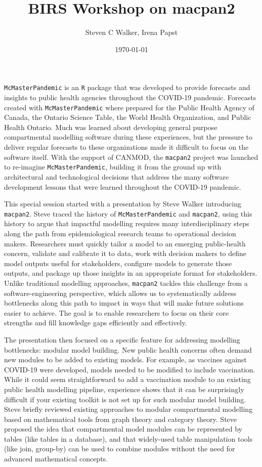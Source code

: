 \documentclass{article}
\title{BIRS Workshop on macpan2}
\date{\today}
\author{Steven C Walker, Irena Papst}
\newcommand{\macpan}{\texttt{macpan2}\xspace}
\newcommand{\macpanOrig}{\texttt{McMasterPandemic}\xspace}
\newcommand{\R}{\texttt{R}\xspace}
\begin{document}
  \maketitle

  \macpanOrig is an \R package that was developed to provide forecasts and insights to public health agencies throughout the COVID-19 pandemic. Forecasts created with \macpanOrig where prepared for the Public Health Agency of Canada, the Ontario Science Table, the World Health Organization, and Public Health Ontario. Much was learned about developing general purpose compartmental modelling software during these experiences, but the pressure to deliver regular forecasts to these organizations made it difficult to focus on the software itself. With the support of CANMOD, the \macpan project was launched to re-imagine \macpanOrig, building it from the ground up with architectural and technological decisions that address the many software development lessons that were learned throughout the COVID-19 pandemic.

  This special session started with a presentation by Steve Walker introducing \macpan. Steve traced the history of \macpanOrig and \macpan, using this history to argue that impactful modelling requires many interdisciplinary steps along the path from epidemiological research teams to operational decision makers. Researchers must quickly tailor a model to an emerging public-health concern, validate and calibrate it to data, work with decision makers to define model outputs useful for stakeholders, configure models to generate those outputs, and package up those insights in an appropriate format for stakeholders. Unlike traditional modelling approaches, \macpan tackles this challenge from a software-engineering perspective, which allows us to systematically address bottlenecks along this path to impact in ways that will make future solutions easier to achieve. The goal is to enable researchers to focus on their core strengths and fill knowledge gaps efficiently and effectively.

  The presentation then focused on a specific feature for addressing modelling bottlenecks: modular model building. New public health concerns often demand new modules to be added to existing models. For example, as vaccines against COVID-19 were developed, models needed to be modified to include vaccination. While it could seem straightforward to add a vaccination module to an existing public health modelling pipeline, experience shows that it can be surprisingly difficult if your existing toolkit is not set up for such modular model building. Steve briefly reviewed existing approaches to modular compartmental modelling based on mathematical tools from graph theory and category theory. Steve proposed the idea that compartmental model modules can be represented by tables (like tables in a database), and that widely-used table manipulation tools (like join, group-by) can be used to combine modules without the need for advanced mathematical concepts.
\end{document}
